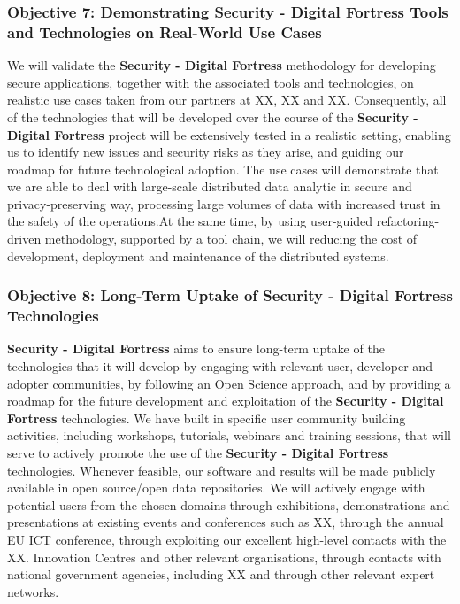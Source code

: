 \documentclass[a4paper,11pt]{article}
\newcommand{\project}[1]{\textbf{#1}\xspace}
\newcommand{\SECURITY}{\project{Security - Digital Fortress}}
\newcommand{\TheProject}{\SECURITY}
\begin{document}
\subsubsection*{Objective 7: Demonstrating \TheProject{} Tools and Technologies on Real-World Use Cases}
\vspace{-6pt}
We will validate the \TheProject{} methodology for developing secure applications, together with the associated tools and technologies, on realistic use cases taken from our partners at XX, XX and XX.
Consequently, all of the technologies that will be developed over the course of the \TheProject{} project will be extensively tested in a realistic setting, enabling us to identify new issues and security risks as they arise, and guiding our roadmap for future technological adoption. The use cases will demonstrate that we are able to deal with large-scale distributed data analytic in secure and privacy-preserving way, processing large volumes of data with increased trust in the safety of the operations.At the same time, by using user-guided refactoring-driven methodology, supported by a tool chain, we will reducing the cost of development, deployment and maintenance of the distributed systems.

\subsubsection*{Objective 8: Long-Term Uptake of \TheProject{} Technologies} 
\vspace{-7pt}
\TheProject{} aims to ensure long-term uptake of the technologies that it will develop by engaging with relevant user, developer and adopter communities, by following an Open Science approach, and by providing a roadmap for the future development and exploitation of the \TheProject{} technologies. We have built in specific user community building activities, including workshops, tutorials, webinars and training sessions, that will serve to actively promote the use of the \TheProject{} technologies. Whenever feasible, our software and results will be made publicly available in open source/open data repositories. We will actively engage with potential users from the chosen domains through exhibitions, demonstrations and presentations at existing events and conferences such as XX, through the annual EU ICT conference, through exploiting our excellent high-level contacts with the XX. Innovation Centres and other relevant organisations, through contacts with national government agencies, including XX and through other relevant expert networks.
\end{document}
